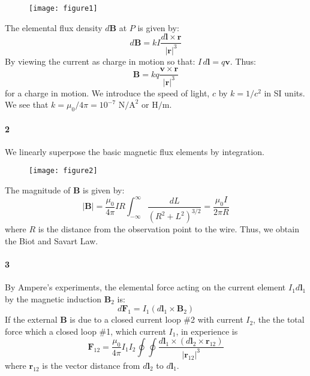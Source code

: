 \documentclass{article}
\begin{document}
	\begin{figure}[h]
		\centering
		\texttt{[image: figure1]}
		\caption{}
		\label{fig:figure1}
	\end{figure}
	
	The elemental flux density $d\mathbf{B}$ at $P$ is given by:
	\begin{equation*}
		d\mathbf{B} = kI \frac{d\mathbf{l} \times \mathbf{r}}{|\mathbf{r}|^3}
	\end{equation*}
	By viewing the current as charge in motion so that: $I\,d\mathbf{l} = q\mathbf{v}$. Thus:
	\begin{equation*}
		\mathbf{B} = kq \frac{\mathbf{v} \times \mathbf{r}}{|\mathbf{r}|^3}
	\end{equation*}
	for a charge in motion. We introduce the speed of light, $c$ by $k = 1/c^2$ in SI units. We see that $k = \mu_0 / 4\pi = 10^{-7} \text{ N/A}^2 \text{ or H/m}$.
	
	\paragraph{2}
	We linearly superpose the basic magnetic flux elements by integration. 
	
	\begin{figure}[h]
		\centering
		\texttt{[image: figure2]}
		\caption{}
		\label{fig:figure2}
	\end{figure}
	
	The magnitude of $\mathbf{B}$ is given by:
	\begin{equation*}
		|\mathbf{B}| = \frac{\mu_0}{4\pi} IR \int_{-\infty}^{\infty} \frac{dL}{(R^2+L^2)^{3/2}} = \frac{\mu_0 I}{2\pi R}
	\end{equation*}
	where $R$ is the distance from the observation point to the wire. Thus, we obtain the Biot and Savart Law.
	
	\paragraph{3}
	By Ampere's experiments, the elemental force acting on the current element $I_1 d\mathbf{l}_1$ by the magnetic induction $\mathbf{B}_2$ is:
	\begin{equation*}
		d\mathbf{F}_1 = I_1 (d\mathbf{l}_1 \times \mathbf{B}_2)
	\end{equation*}
	If the external $\mathbf{B}$ is due to a closed current loop \#2 with current $I_2$, the the total force which a closed loop \#1, which current $I_1$, in experience is
	\begin{equation*}
		\mathbf{F}_{12} = \frac{\mu_0}{4\pi} I_1 I_2 \oint \oint \frac{d\mathbf{l}_1 \times (d\mathbf{l}_2 \times \mathbf{r}_{12})}{|\mathbf{r}_{12}|^3}
	\end{equation*}
	where $\mathbf{r}_{12}$ is the vector distance from $d\mathbf{l}_2$ to $d\mathbf{l}_1$. 
	
\end{document}
